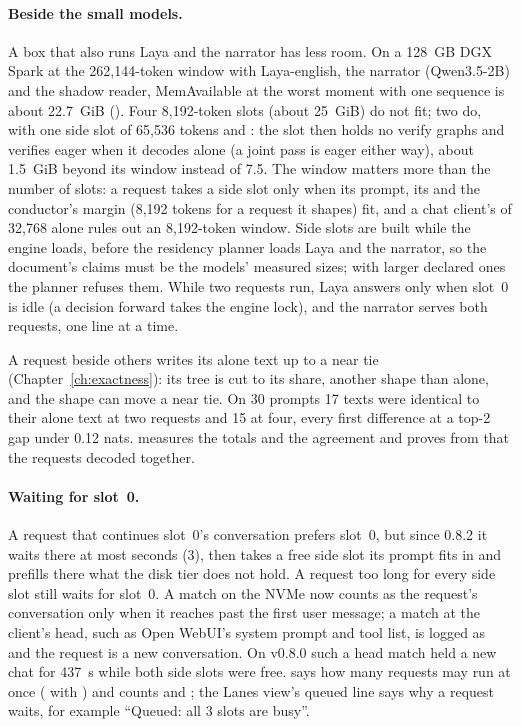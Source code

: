 \paragraph{Beside the small models.} A box that also runs Laya and the narrator has less room. On a 128~GB DGX Spark at the 262,144-token window with Laya-english, the narrator (Qwen3.5-2B) and the shadow reader, MemAvailable at the worst moment with one sequence is about 22.7~GiB (\measured). Four 8,192-token slots (about 25~GiB) do not fit; two do, with one side slot of 65,536 tokens and : the slot then holds no verify graphs and verifies eager when it decodes alone (a joint pass is eager either way), about 1.5~GiB beyond its window instead of 7.5. The window matters more than the number of slots: a request takes a side slot only when its prompt, its  and the conductor's margin (8,192 tokens for a request it shapes) fit, and a chat client's  of 32,768 alone rules out an 8,192-token window. Side slots are built while the engine loads, before the residency planner loads Laya and the narrator, so the  document's claims must be the models' measured sizes; with larger declared ones the planner refuses them. While two requests run, Laya answers only when slot~0 is idle (a decision forward takes the engine lock), and the narrator serves both requests, one line at a time.

A request beside others writes its alone text up to a near tie (Chapter~\ref{ch:exactness}): its tree is cut to its share, another shape than alone, and the shape can move a near tie. On 30 prompts 17 texts were identical to their alone text at two requests and 15 at four, every first difference at a top-2 gap under 0.12 nats.  measures the totals and the agreement and proves from  that the requests decoded together.

\paragraph{Waiting for slot~0.} A request that continues slot~0's conversation prefers slot~0, but since 0.8.2 it waits there at most  seconds (3), then takes a free side slot its prompt fits in and prefills there what the disk tier does not hold. A request too long for every side slot still waits for slot~0. A match on the NVMe now counts as the request's conversation only when it reaches past the first user message; a match at the client's head, such as Open WebUI's system prompt and tool list, is logged as  and the request is a new conversation. On v0.8.0 such a head match held a new chat for 437~s while both side slots were free.   says how many requests may run at once ( with ) and counts  and ; the Lanes view's queued line says why a request waits, for example \enquote{Queued: all 3 slots are busy}.

